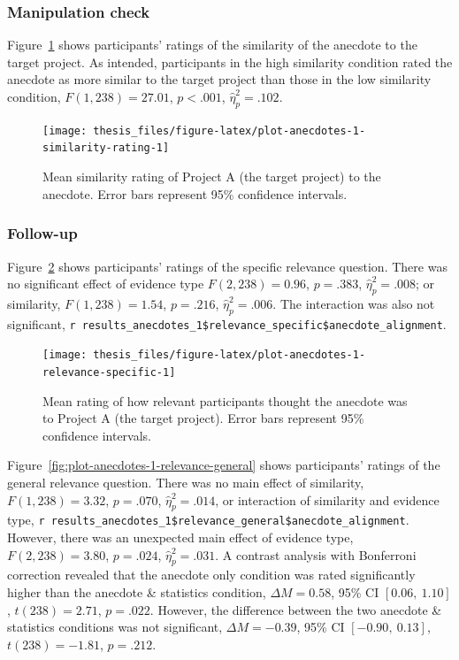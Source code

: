\documentclass[a4paper, nobind, dvipsnames]{templates/ociamthesis}
\theoremstyle{definition}
\theoremstyle{definition}
\theoremstyle{definition}
\theoremstyle{definition}
\theoremstyle{remark}
\begin{document}
\subsubsection{Manipulation check}

Figure~\ref{fig:plot-anecdotes-1-similarity-rating} shows participants' ratings
of the similarity of the anecdote to the target project. As intended,
participants in the high similarity condition rated the anecdote as more similar
to the target project than those in the low similarity condition,
\(F(1, 238) = 27.01\), \(p < .001\), \(\hat{\eta}^2_p = .102\).



\begin{figure}
\texttt{[image: thesis\_files/figure-latex/plot-anecdotes-1-similarity-rating-1]} \caption{Mean similarity rating of Project A (the target project) to the anecdote. Error bars represent 95\% confidence intervals.}\label{fig:plot-anecdotes-1-similarity-rating}
\end{figure}

\subsubsection{Follow-up}

Figure~\ref{fig:plot-anecdotes-1-relevance-specific} shows participants'
ratings of the specific relevance question. There was no significant effect of
evidence type \(F(2, 238) = 0.96\), \(p = .383\), \(\hat{\eta}^2_p = .008\); or
similarity, \(F(1, 238) = 1.54\), \(p = .216\), \(\hat{\eta}^2_p = .006\). The
interaction was also not significant, \texttt{r\ results\_anecdotes\_1\$relevance\_specific\$anecdote\_alignment}.



\begin{figure}
\texttt{[image: thesis\_files/figure-latex/plot-anecdotes-1-relevance-specific-1]} \caption{Mean rating of how relevant participants thought the anecdote was to Project A (the target project). Error bars represent 95\% confidence intervals.}\label{fig:plot-anecdotes-1-relevance-specific}
\end{figure}

Figure~\ref{fig:plot-anecdotes-1-relevance-general} shows participants' ratings
of the general relevance question. There was no main effect of similarity,
\(F(1, 238) = 3.32\), \(p = .070\), \(\hat{\eta}^2_p = .014\), or interaction of
similarity and evidence type, \texttt{r\ results\_anecdotes\_1\$relevance\_general\$anecdote\_alignment}. However, there was an
unexpected main effect of evidence type,
\(F(2, 238) = 3.80\), \(p = .024\), \(\hat{\eta}^2_p = .031\). A contrast analysis with
Bonferroni correction revealed that the anecdote only condition was rated
significantly higher than the anecdote \& statistics condition,
\(\Delta M = 0.58\), 95\% CI \([0.06,~1.10]\), \(t(238) = 2.71\), \(p = .022\). However, the
difference between the two anecdote \& statistics conditions was not significant,
\(\Delta M = -0.39\), 95\% CI \([-0.90,~0.13]\), \(t(238) = -1.81\), \(p = .212\).
\end{document}

